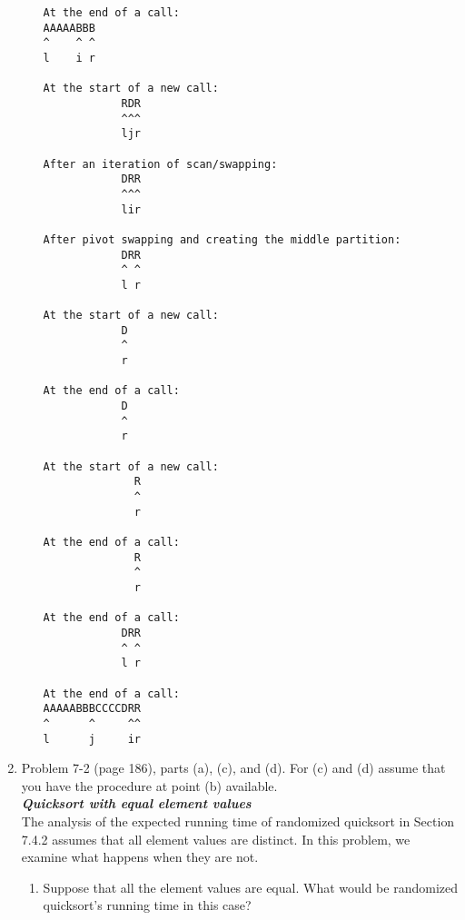 \documentclass[11pts]{article}
\begin{document}
\begin{enumerate}
\begin{enumerate}
\begin{verbatim}
At the end of a call:
AAAAABBB
^    ^ ^
l    i r

At the start of a new call:
            RDR
            ^^^
            ljr

After an iteration of scan/swapping:
            DRR
            ^^^
            lir

After pivot swapping and creating the middle partition:
            DRR
            ^ ^
            l r

At the start of a new call:
            D
            ^
            r

At the end of a call:
            D
            ^
            r

At the start of a new call:
              R
              ^
              r

At the end of a call:
              R
              ^
              r

At the end of a call:
            DRR
            ^ ^
            l r

At the end of a call:
AAAAABBBCCCCDRR
^      ^     ^^
l      j     ir
  \end{verbatim}
  \end{enumerate}

\newpage
\item Problem 7-2 (page 186), parts (a), (c), and (d). For (c) and (d)
      assume that you have the procedure at point (b) available. \\
      \textbf{\textit{ Quicksort with equal element values }} \\
      The analysis of the expected running time of randomized quicksort in
      Section 7.4.2 assumes that all element values are distinct. In this
      problem, we examine what happens when they are not. \\
  \begin{enumerate}
  \item Suppose that all the element values are equal. What would be
        randomized quicksort's running time in this case? \\


\end{enumerate}
\end{enumerate}
\end{document}
